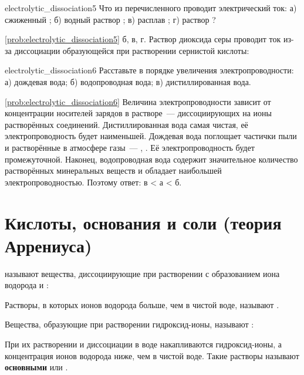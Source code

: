 \begin{problem}{}{electrolytic_dissociation5}
    Что из перечисленного проводит электрический ток: а) сжиженный ; б) водный раствор ; в) расплав ; г) раствор ?
    \begin{sol}{\ref{prob:electrolytic_dissociation5}}
        б, в, г. Раствор диоксида серы проводит ток из-за диссоциации образующейся при растворении сернистой кислоты:
    \end{sol}
\end{problem}

\begin{problem}{}{electrolytic_dissociation6}
    Расставьте в порядке увеличения электропроводности: а) дождевая вода; б) водопроводная вода; в) дистиллированная вода.
    \begin{sol}{\ref{prob:electrolytic_dissociation6}}
        Величина электропроводности зависит от концентрации носителей зарядов в растворе~--- диссоциирующих на ионы растворённых соединений. Дистиллированная вода самая чистая, её электропроводность будет наименьшей. Дождевая вода поглощает частички пыли и растворённые в атмосфере газы~--- , . Её электропроводность будет промежуточной. Наконец, водопроводная вода содержит значительное количество растворённых минеральных веществ и обладает наибольшей электропроводностью. Поэтому ответ: в < а < б.
    \end{sol}
\end{problem}

\clearpage

\section{Кислоты, основания и соли (теория Аррениуса)}

 называют вещества, диссоциирующие при растворении с образованием иона водорода  и :


Растворы, в которых ионов водорода больше, чем в чистой воде, называют .

Вещества, образующие при растворении гидроксид-ионы, называют :


При их растворении и диссоциации в воде накапливаются гидроксид-ионы, а концентрация ионов водорода ниже, чем в чистой воде. Такие растворы называют \textbf{основными} или .

